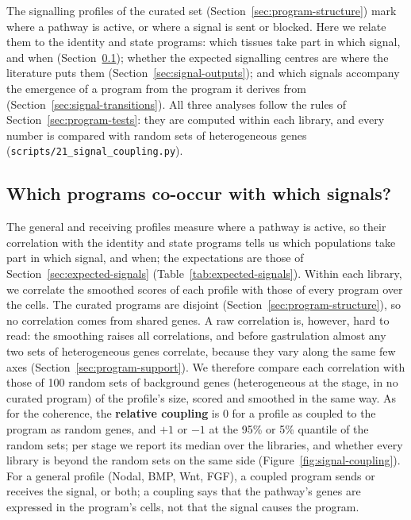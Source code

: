 \documentclass[11pt,a4paper]{article}
\begin{document}
The signalling profiles of the curated set (Section~\ref{sec:program-structure}) mark where a pathway is active, or where a signal is sent or blocked. Here we relate them to the identity and state programs: which tissues take part in which signal, and when (Section~\ref{sec:signal-coupling}); whether the expected signalling centres are where the literature puts them (Section~\ref{sec:signal-outputs}); and which signals accompany the emergence of a program from the program it derives from (Section~\ref{sec:signal-transitions}). All three analyses follow the rules of Section~\ref{sec:program-tests}: they are computed within each library, and every number is compared with random sets of heterogeneous genes (\nolinkurl{scripts/21_signal_coupling.py}).

\subsection{Which programs co-occur with which signals?}
\label{sec:signal-coupling}

The general and receiving profiles measure where a pathway is active, so their correlation with the identity and state programs tells us which populations take part in which signal, and when; the expectations are those of Section~\ref{sec:expected-signals} (Table~\ref{tab:expected-signals}). Within each library, we correlate the smoothed scores of each profile with those of every program over the cells. The curated programs are disjoint (Section~\ref{sec:program-structure}), so no correlation comes from shared genes. A raw correlation is, however, hard to read: the smoothing raises all correlations, and before gastrulation almost any two sets of heterogeneous genes correlate, because they vary along the same few axes (Section~\ref{sec:program-support}). We therefore compare each correlation with those of 100 random sets of background genes (heterogeneous at the stage, in no curated program) of the profile's size, scored and smoothed in the same way. As for the coherence, the \textbf{relative coupling} is 0 for a profile as coupled to the program as random genes, and $+1$ or $-1$ at the 95\% or 5\% quantile of the random sets; per stage we report its median over the libraries, and whether every library is beyond the random sets on the same side (Figure~\ref{fig:signal-coupling}). For a general profile (Nodal, BMP, Wnt, FGF), a coupled program sends or receives the signal, or both; a coupling says that the pathway's genes are expressed in the program's cells, not that the signal causes the program.
\end{document}
